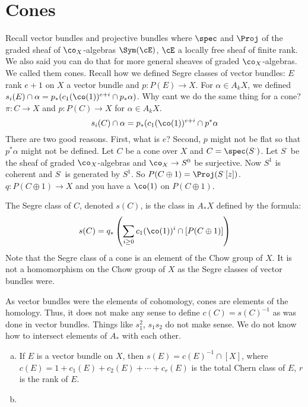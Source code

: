 
\newpage
\section{Cones}

Recall vector bundles and projective bundles where $\spec$ and $\Proj$ of the graded sheaf of $\co_X$-algebras $\Sym(\cE)$, $\cE$ a locally free sheaf of finite rank. We also said you can do that for more general sheaves of graded $\co_X$-algebras. We called them cones. Recall how we defined Segre classes of vector bundles: $E$ rank $e+1$ on $X$ a vector bundle and $p: P(E) \to X$. For $\alpha \in A_kX$, we defined $s_i(E) \cap \alpha= p_*(c_1(\co(1))^{e+i} \cap p_*\alpha)$. Why cant we do the same thing for a cone? $\pi: C \to X$ and $p:P(C) \to X$ for $\alpha \in A_kX$.
	\[
	s_i(C) \cap \alpha = p_*(c_1(\co(1))^{e+i} \cap p^* \alpha
	\]
There are two good reasons. First, what is $e$? Second, $p$ might not be flat so that $p^*\alpha$ might not be defined. Let $C$ be a cone over $X$ and $C=\spec(S^\cdot)$. Let $S^\cdot$ be the sheaf of graded $\co_X$-algebras and $\co_X \to S^0$ be surjective. Now $S^1$ is coherent and $S^\cdot$ is generated by $S^1$. So $P(C \oplus 1)=\Proj(S^\cdot[z])$. $q: P(C \oplus 1) \to X$ and you have a $\co(1)$ on $P(C \oplus 1)$.


\begin{dfn}
The Segre class of $C$, denoted $s(C)$, is the class in $A_*X$ defined by the formula:
	\[
	s(C)= q_*\left(\sum_{i \geq 0} c_1(\co(1))^i \cap [P(C \oplus 1)] \right)
	\]
Note that the Segre class of a cone is an element of the Chow group of $X$. It is not a homomorphism on the Chow group of $X$ as the Segre classes of vector bundles were. 
\end{dfn}

As vector bundles were the elements of cohomology, cones are elements of the homology. Thus, it does not make any sense to define $c(C)=s(C)^{-1}$ as was done in vector bundles. Things like $s_1^2$, $s_1s_2$ do not make sense. We do not know how to intersect elements of $A_*$ with each other.

\begin{prop}
\begin{enumerate}[(a)]
\item If $E$ is a vector bundle on $X$, then $s(E)=c(E)^{-1} \cap [X]$, where $c(E)=1+c_1(E)+c_2(E)+\cdots+c_r(E)$ is the total Chern class of $E$, $r$ is the rank of $E$. 
\item 
\end{enumerate}
\end{prop}

